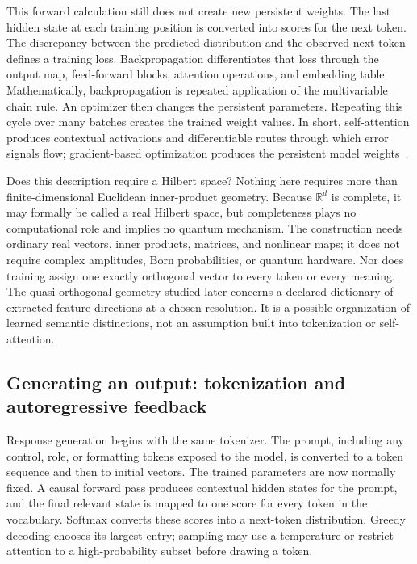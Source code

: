 \documentclass[
  aps,
  reprint,
  superscriptaddress,
  floatfix,
  nofootinbib,
  longbibliography
]{revtex4-2}
\newcommand{\R}{\mathbb{R}}
\begin{document}
This forward calculation still does not create new persistent weights.  The
last hidden state at each training position is converted into scores for the
next token.  The discrepancy between the predicted distribution and the
observed next token defines a training loss.  Backpropagation differentiates
that loss through the output map, feed-forward blocks, attention operations,
and embedding table.  Mathematically, backpropagation is repeated application
of the multivariable chain rule.  An optimizer then changes the persistent
parameters.
Repeating this cycle over many batches creates the trained weight values.  In
short, self-attention produces contextual activations and differentiable
routes through which error signals flow; gradient-based optimization produces
the persistent model weights~\cite{Goodfellow-et-al-2016-Book}.

Does this description require a Hilbert space?  Nothing here requires more
than finite-dimensional Euclidean inner-product geometry.  Because $\R^d$ is
complete, it may formally be called a real Hilbert space, but completeness
plays no computational role and implies no quantum mechanism.  The
construction needs ordinary real vectors, inner products, matrices, and
nonlinear maps; it does not require complex amplitudes, Born probabilities, or
quantum hardware.  Nor does training assign one exactly orthogonal vector to
every token or every meaning.  The quasi-orthogonal geometry studied later
concerns a declared dictionary of extracted feature directions at a chosen
resolution.  It is a possible organization of learned semantic distinctions,
not an assumption built into tokenization or self-attention.

\subsection{Generating an output: tokenization and autoregressive feedback}
\label{sec:prose-generation}

Response generation begins with the same tokenizer.  The prompt, including
any control, role, or formatting tokens exposed to the model, is converted to
a token sequence and then to initial vectors.  The trained parameters are now
normally fixed.  A causal forward pass produces contextual hidden states for
the prompt, and the final relevant state is mapped to one score for every
token in the vocabulary.  Softmax converts these scores into a next-token
distribution.  Greedy decoding chooses its largest entry; sampling may use a
temperature or restrict attention to a high-probability subset before drawing
a token.
\end{document}
